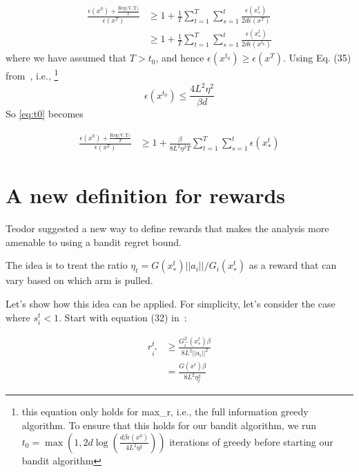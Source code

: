 \documentclass[letterpaper]{article}
\newcommand{\istar}{i^*}
\begin{document}
\begin{align}
    \frac{\epsilon(x^0) + \frac{\text{Reg(V,T)}}{T}}{\epsilon(x^T)} &\geq 1 + \frac{1}{T}\sum_{t=1}^T \sum_{s=1}^t \frac{\epsilon(x^t_*)}{2d\epsilon(x^T)}\\
    &\geq 1 + \frac{1}{T}\sum_{t=1}^T \sum_{s=1}^t \frac{\epsilon(x^t_*)}{2d\epsilon(x^{t_0})}
    \label{eq:t0}
\end{align}
where we have assumed that $T > t_0$, and hence $\epsilon(x^{t_0}) \geq \epsilon(x^{T})$. Using Eq. (35) from~\cite{salehi2018coordinate}, i.e.,
\footnote{this equation only holds for max\_r, i.e., the full information greedy algorithm. To ensure that this holds for our bandit algorithm, we run $t_0 = \max(1, 2d \log(\frac{d \beta \epsilon(x^0)}{4L^2 \eta^2}))$ iterations of greedy before starting our bandit algorithm}
\begin{equation}
    \epsilon(x^{t_0}) \leq \frac{4L^2 \eta^2}{\beta d}
\end{equation}
So \ref{eq:t0} becomes

\begin{align}
    \frac{\epsilon(x^0) + \frac{\text{Reg(V,T)}}{T}}{\epsilon(x^T)} &\geq 1 + \frac{\beta}{8L^2 \eta^2 T}\sum_{t=1}^T \sum_{s=1}^t \epsilon(x^t_*)
    \label{eq:t0}
\end{align}


\section{A new definition for rewards}
\label{sec:new_definition_for_rewards}
Teodor suggested a new way to define rewards that makes the analysis more amenable to using a bandit regret bound. 

The idea is to treat the ratio $\eta_t = G(x^t_*) ||a_i|| / G_i(x^t_*)$ as a reward that can vary based on which arm is pulled.

Let's show how this idea can be applied. For simplicity, let's consider the case where $s_i^t < 1$. Start with equation (32) in~\cite{salehi2018coordinate}:

\begin{align}
    r_{\istar}^t &\geq \frac{G_{\istar}^2 (x^t_*) \beta}{8L^2 ||a_i||^2} \\
    &= \frac{G(x^t) \beta}{8L^2 \eta_t^2}
\end{align}
\end{document}
